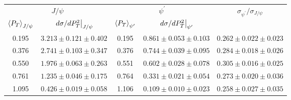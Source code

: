 \begin{tabular}{cc|cc|c}
\hline
\multicolumn{2}{c|}{$J/\psi$} &
  \multicolumn{2}{c|}{$\psi^{\prime}$} &
  \multirow{2}{*}{$\sigma_{\psi^\prime}/\sigma_{J/\psi}$} \\ \cline{1-4}
$\expval{P_T}_{J/\psi}$ &
  $\eval{d\sigma/dP^2_T}_{J/\psi}$ &
  $\expval{P_T}_{\psi^\prime}$ &
  $\eval{d\sigma/dP^2_T}_{\psi^\prime}$ &
   \\ \hline
0.195 & $3.213\pm0.121\pm0.402$ & 0.195 & $0.861\pm0.053\pm0.103$ & $0.262\pm0.022\pm0.023$ \\
0.376 & $2.741\pm0.103\pm0.347$ & 0.376 & $0.744\pm0.039\pm0.095$ & $0.284\pm0.018\pm0.026$ \\
0.550 & $1.976\pm0.063\pm0.263$ & 0.551 & $0.602\pm0.028\pm0.078$ & $0.305\pm0.016\pm0.025$ \\
0.761 & $1.235\pm0.046\pm0.175$ & 0.764 & $0.331\pm0.021\pm0.054$ & $0.273\pm0.020\pm0.036$ \\
1.095 & $0.426\pm0.019\pm0.058$ & 1.106 & $0.109\pm0.010\pm0.023$ & $0.258\pm0.027\pm0.035$ \\ \hline
\end{tabular}
